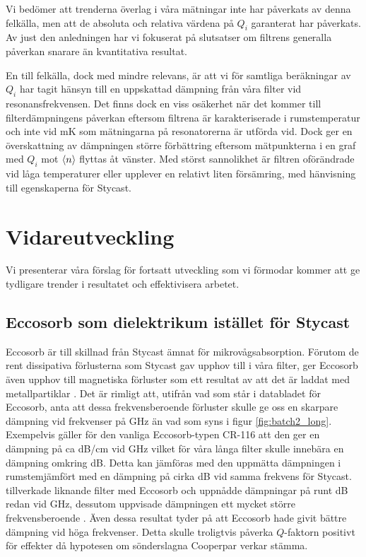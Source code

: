 \documentclass[main.tex]{subfiles}
\begin{document}
Vi bedömer att trenderna överlag i våra mätningar inte har påverkats av denna felkälla, men att de absoluta och relativa värdena på $Q_i$ garanterat har påverkats. Av just den anledningen har vi fokuserat på slutsatser om filtrens generalla påverkan snarare än kvantitativa resultat. 

En till felkälla, dock med mindre relevans, är att vi för samtliga beräkningar av $Q_i$ har tagit hänsyn till en uppskattad dämpning från våra filter vid resonansfrekvensen. Det finns dock en viss osäkerhet när det kommer till filterdämpningens påverkan eftersom filtrena är karakteriserade i rumstemperatur och inte vid \unit[10]{mK} som mätningarna på resonatorerna är utförda vid. Dock ger en överskattning av dämpningen större förbättring eftersom mätpunkterna i en graf med $Q_i$ mot $\expval{n}$ flyttas åt vänster. Med störst sannolikhet är filtren oförändrade vid låga temperaturer eller upplever en relativt liten försämring, med hänvisning till egenskaperna för Stycast.



\section{Vidareutveckling}
Vi presenterar våra förslag för fortsatt utveckling som vi förmodar kommer att ge tydligare trender i resultatet och effektivisera arbetet.

\subsection{Eccosorb som dielektrikum istället för Stycast}
Eccosorb är till skillnad från Stycast ämnat för mikrovågsabsorption. Förutom de rent dissipativa förlusterna som Stycast gav upphov till i våra filter, ger Eccosorb även upphov till magnetiska förluster som ett resultat av att det är laddat med metallpartiklar \cite{Eccosorb}. Det är rimligt att, utifrån vad som står i databladet för Eccosorb, anta att dessa frekvensberoende förluster skulle ge oss en skarpare dämpning vid frekvenser på \unit[8-50]{GHz} än vad som syns i figur \ref{fig:batch2_long}. Exempelvis gäller för den vanliga Eccosorb-typen CR-116 att den ger en dämpning på ca \unit[57]{dB/cm} vid \unit[18]{GHz} \cite{Eccosorb} vilket för våra långa filter skulle innebära en dämpning omkring \unit[150]{dB}. Detta kan jämföras med den uppmätta dämpningen i rumstemjämfört med en dämpning på cirka \unit[10]{dB} vid samma frekvens för Stycast. \citeauthor{santavicca2008} tillverkade liknande filter med Eccosorb och uppnådde dämpningar på runt \unit[80]{dB} redan vid \unit[10]{GHz}, dessutom uppvisade dämpningen ett mycket större frekvensberoende \cite{santavicca2008}. Även dessa resultat tyder på att Eccosorb hade givit bättre dämpning vid höga frekvenser. Detta skulle troligtvis påverka $Q$-faktorn positivt för effekter då hypotesen om sönderslagna Cooperpar verkar stämma.
\end{document}
